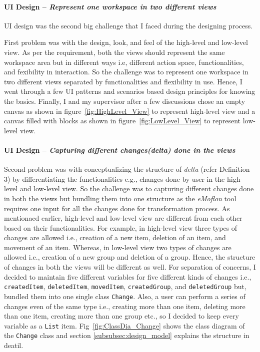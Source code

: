 \paragraph{UI Design -- \textit{Represent one workspace in two different views}}
UI design was the second big challenge that I faced during the designing process.

First problem was with the design, look, and feel of the high-level and low-level view. As per the requirement, both the views should represent the same workspace area but in different ways i.e, different action space, functionalities, and fexibility in interaction. So the challenge was to represent one workspace in two different views separated by functionalities and flexibility in use. Hence, I went through a few UI patterns \cite{designinterfaces} and scenarios based design principles \cite{scenariobasedui} for knowing the basics. Finally, I and my supervisor after a few discussions chose an empty canvas as shown in figure~\ref{fig:HighLevel_View} to represent high-level view and a canvas filled with blocks as shown in figure~\ref{fig:LowLevel_View} to represent low-level view.

\paragraph{UI Design -- \textit{Capturing different changes(delta) done in the views}}
Second problem was with conceptualizing the structure of \textit{delta} (refer Definition 3) by differentiating the functionalities e.g., changes done by user in the high-level and low-level view. So the challenge was to capturing different changes done in both the views but bundling them into one structure as the \textit{eMoflon} tool requires one input for all the changes done for transformation process. As mentionaed earlier, high-level and low-level view are different from each other based on their functionalities. For example, in high-level view three types of changes are allowed i.e., creation of a new item, deletion of an item, and movement of an item. Whereas, in low-level view two types of changes are allowed i.e., creation of a new group and deletion of a group. Hence, the structure of changes in both the views will be different as well. For separation of concerns, I decided to maintain five different variables for five different kinds of changes i.e., \texttt{createdItem}, \texttt{deletedItem}, \texttt{movedItem}, \texttt{createdGroup}, and \texttt{deletedGroup} but, bundled them into one single class \texttt{Change}. Also, a user can perform a series of changes even of the same type i.e., creating more than one item, deleting more than one item, creating more than one group etc., so I decided to keep every variable as a \texttt{List} item. Fig~\ref{fig:ClassDia_Change} shows the class diagram of the \texttt{Change} class and section \ref{subsubsec:design_model} explains the structure in deatil.
